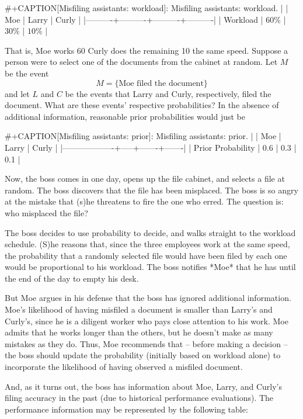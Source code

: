#+CAPTION[Misfiling assistants: workload]: Misfiling assistants: workload.
|          | Moe      | Larry    | Curly    |
|----------+----------+----------+----------|
| Workload | \(60\%\) | \(30\%\) | \(10\%\) |

That is, Moe works 60%
Curly does the remaining 10%
the same speed. Suppose a person were to select one of the documents
from the cabinet at random. Let \(M\) be the event \[ M= \{ \mbox{Moe
filed the document} \} \] and let \(L\) and \(C\) be the events that
Larry and Curly, respectively, filed the document. What are these
events' respective probabilities? In the absence of additional
information, reasonable prior probabilities would just be

#+CAPTION[Misfiling assistants: prior]: Misfiling assistants: prior.
|                   | Moe | Larry | Curly |
|-------------------+-----+-------+-------|
| Prior Probability | 0.6 |   0.3 |   0.1 |

Now, the boss comes in one day, opens up the file cabinet, and selects
a file at random. The boss discovers that the file has been
misplaced. The boss is so angry at the mistake that (s)he threatens to
fire the one who erred. The question is: who misplaced the file?

The boss decides to use probability to decide, and walks straight to
the workload schedule. (S)he reasons that, since the three employees
work at the same speed, the probability that a randomly selected file
would have been filed by each one would be proportional to his
workload. The boss notifies *Moe* that he has until the end of the day
to empty his desk.

But Moe argues in his defense that the boss has ignored additional
information. Moe's likelihood of having misfiled a document is smaller
than Larry's and Curly's, since he is a diligent worker who pays close
attention to his work. Moe admits that he works longer than the
others, but he doesn't make as many mistakes as they do. Thus, Moe
recommends that -- before making a decision -- the boss should update
the probability (initially based on workload alone) to incorporate the
likelihood of having observed a misfiled document.

And, as it turns out, the boss has information about Moe, Larry, and
Curly's filing accuracy in the past (due to historical performance
evaluations). The performance information may be represented by the
following table:

